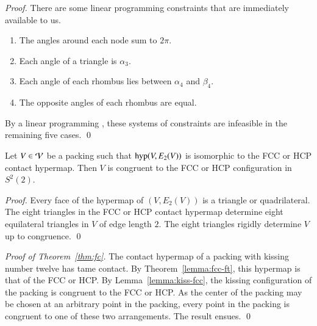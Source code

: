 \documentclass{llncs}
\def\op#1{{\hbox{#1}}}
\begin{document}
\begin{proof}
\figCXFENOK %


There are some linear
  programming constraints that are immediately available to us.
\begin{enumerate}\wasitemize 
\item The angles around each node sum to $2\pi$.
\item Each angle of a triangle is $\alpha_3$.
\item Each angle of each rhombus lies between $\alpha_4$ and $\beta_4$.
\item The opposite angles of each rhombus are equal.
\end{enumerate}\wasitemize 
By a linear programming ,
these systems of constraints are infeasible in the remaining five cases.
\qed\end{proof}


\begin{lemma}\label{lemma:kiss-fcc}
  Let $V\in {\mathcal V}$ be a packing such that $\op{hyp}(V,E_2(V))$ is
  isomorphic to the FCC or HCP contact hypermap.  Then $V$ is
  congruent to the FCC or HCP configuration in $S^2(2)$.
\end{lemma}
%
%
%
%

\begin{proof} Every face of the hypermap of $(V,E_2(V))$ is a
  triangle or quadrilateral.  The eight triangles in the FCC or HCP
  contact hypermap determine eight equilateral triangles in $V$ of
  edge length $2$.  The eight triangles rigidly determine $V$ up to
  congruence.
\qed\end{proof}

\begin{proof}[Proof of Theorem~\ref{thm:fc}]  
  The contact hypermap of a packing with kissing number twelve has tame
  contact.  By Theorem~\ref{lemma:fcc-ft}, this hypermap is that of
  the FCC or HCP.  By Lemma~\ref{lemma:kiss-fcc}, the kissing
  configuration of the packing is congruent to the FCC or HCP.  As the
  center of the packing may be chosen at an arbitrary point in the
  packing, every point in the packing is congruent to one of these two
  arrangements.  The result ensues.
\qed\end{proof}





\raggedright

%


\newpage
\bigskip
\noindent
\smallskip

\noindent
\endnote
\end{document}
